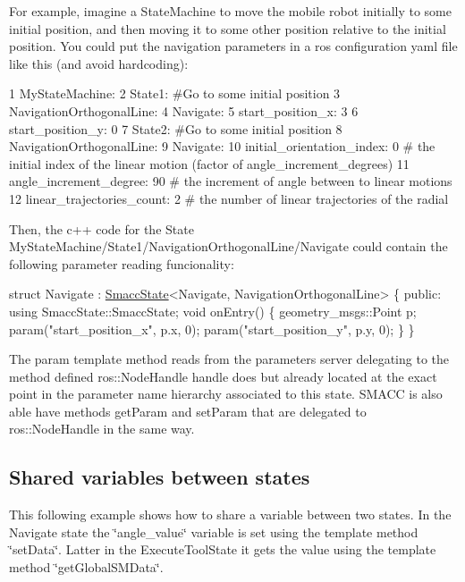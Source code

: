 For example, imagine a State\+Machine to move the mobile robot initially to some initial position, and then moving it to some other position relative to the initial position. You could put the navigation parameters in a ros configuration yaml file like this (and avoid hardcoding)\+:


\begin{DoxyCode}
1 MyStateMachine:
2     State1: #Go to some initial position
3         NavigationOrthogonalLine:
4             Navigate:
5                 start\_position\_x: 3
6                 start\_position\_y: 0
7     State2: #Go to some initial position
8         NavigationOrthogonalLine:
9             Navigate:
10                 initial\_orientation\_index: 0 # the initial index of the linear motion (factor of
       angle\_increment\_degrees)
11                 angle\_increment\_degree: 90    # the increment of angle between to linear motions
12                 linear\_trajectories\_count: 2  # the number of linear trajectories of the radial 
\end{DoxyCode}


Then, the c++ code for the State My\+State\+Machine/\+State1/\+Navigation\+Orthogonal\+Line/\+Navigate could contain the following parameter reading funcionality\+:


\begin{DoxyCode}
\textcolor{keyword}{struct }Navigate : \hyperlink{classSmaccState}{SmaccState}<Navigate, NavigationOrthogonalLine> 
\{
\textcolor{keyword}{public}:
  \textcolor{keyword}{using} SmaccState::SmaccState;
  \textcolor{keywordtype}{void} onEntry()
  \{
      geometry\_msgs::Point p;
      param(\textcolor{stringliteral}{"start\_position\_x"}, p.x, 0);
      param(\textcolor{stringliteral}{"start\_position\_y"}, p.y, 0);
  \}
\}
\end{DoxyCode}


The param template method reads from the parameters server delegating to the method defined ros\+::\+Node\+Handle handle does but already located at the exact point in the parameter name hierarchy associated to this state. S\+M\+A\+CC is also able have methods get\+Param and set\+Param that are delegated to ros\+::\+Node\+Handle in the same way.

\subsection*{Shared variables between states}

This following example shows how to share a variable between two states. In the Navigate state the \char`\"{}angle\+\_\+value\char`\"{} variable is set using the template method \char`\"{}set\+Data\char`\"{}. Latter in the Execute\+Tool\+State it gets the value using the template method \char`\"{}get\+Global\+S\+M\+Data\char`\"{}.


